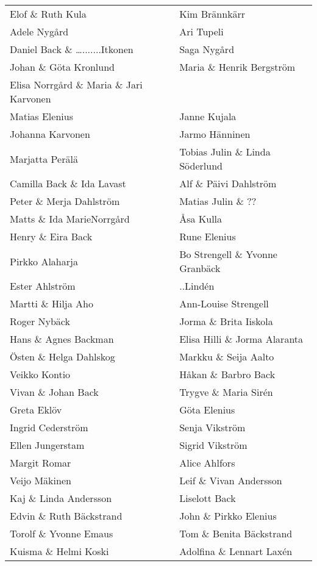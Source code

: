 \begin{center}
  \begin{longtable}{l l}
    \hline
    Elof \& Ruth Kula &  Kim Brännkärr \\
    Adele Nygård & Ari Tupeli \\
    Daniel Back \& ….......Itkonen & Saga Nygård \\
    Johan \& Göta Kronlund & Maria \& Henrik Bergström \\
    Elisa Norrgård \& Maria \& Jari Karvonen \\
    Matias Elenius & Janne Kujala \\
    Johanna Karvonen & Jarmo Hänninen \\
    Marjatta Perälä & Tobias Julin \& Linda Söderlund \\
    Camilla Back \& Ida Lavast & Alf \& Päivi Dahlström \\
    Peter \& Merja Dahlström & Matias Julin \&  ?? \\
    Matts \& Ida MarieNorrgård & Åsa Kulla \\
    Henry \& Eira Back & Rune Elenius \\
    Pirkko Alaharja & Bo Strengell \& Yvonne Granbäck \\
    Ester Ahlström & ..Lindén \\
    Martti \& Hilja Aho & Ann-Louise Strengell \\
    Roger Nybäck & Jorma \& Brita Iiskola \\
    Hans \& Agnes Backman & Elisa Hilli \& Jorma Alaranta \\
    Östen \& Helga Dahlskog & Markku \& Seija Aalto \\
    Veikko Kontio & Håkan \& Barbro Back \\
    Vivan \& Johan Back & Trygve \& Maria Sirén \\
    Greta Eklöv & Göta Elenius \\
    Ingrid Cederström & Senja Vikström \\
    Ellen Jungerstam & Sigrid Vikström \\
    Margit Romar & Alice Ahlfors \\
    Veijo Mäkinen & Leif \& Vivan Andersson \\
    Kaj \& Linda Andersson & Liselott Back \\
    Edvin \& Ruth Bäckstrand & John \& Pirkko Elenius \\
    Torolf \& Yvonne Emaus & Tom \& Benita Bäckstrand \\
    Kuisma \& Helmi Koski & Adolfina \& Lennart Laxén \\

\end{longtable}
\end{center}

